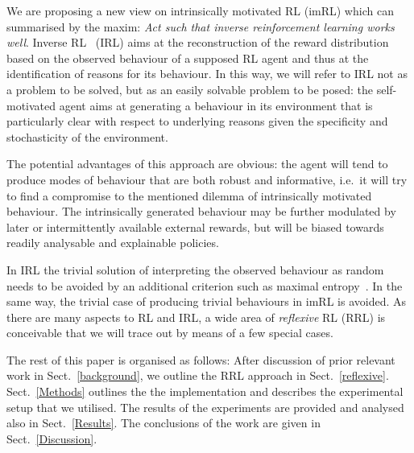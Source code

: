 \documentclass{article}
\begin{document}
We are proposing a new view on intrinsically motivated RL (imRL) which can summarised by the 
maxim: \emph{Act such that inverse reinforcement learning works well}. 
Inverse RL~\cite{ng2000algorithms} (IRL) aims at the reconstruction of the reward distribution based
on the observed behaviour of a supposed RL agent and thus at the identification of reasons 
for its behaviour. In this way, we will refer to IRL not as a problem to be solved, 
but as an easily solvable problem to be posed: 
the self-motivated agent aims at generating a behaviour in its environment that 
is particularly clear with respect to underlying reasons given the specificity and 
stochasticity of the environment. 

The potential advantages of this approach are obvious: the
agent will tend to produce modes of behaviour that are both robust and informative, i.e.~it
will try to find a compromise to the mentioned dilemma of intrinsically motivated behaviour.
The intrinsically generated behaviour may be further modulated by later or intermittently 
available external rewards, but will be biased towards readily analysable and explainable
policies. 

In IRL the trivial solution of interpreting the observed behaviour as random 
needs to be avoided by an additional criterion such as maximal entropy~\cite{ziebart2008maximum}. 
In the same way, the trivial case of producing trivial behaviours in imRL is avoided.
As there are many aspects to RL and IRL, a wide area of \emph{reflexive} RL (RRL) is 
conceivable that we will trace out by means of a few special cases.


The rest of this paper is organised as follows: After discussion of prior relevant work in Sect.~\ref{background}, we outline the RRL approach in Sect.~\ref{reflexive}. Sect.~\ref{Methods} outlines the the implementation and describes the experimental setup that we utilised. The results of the experiments are provided and analysed also in Sect.~\ref{Results}. The conclusions of the work are given in Sect.~\ref{Discussion}.
\end{document}
